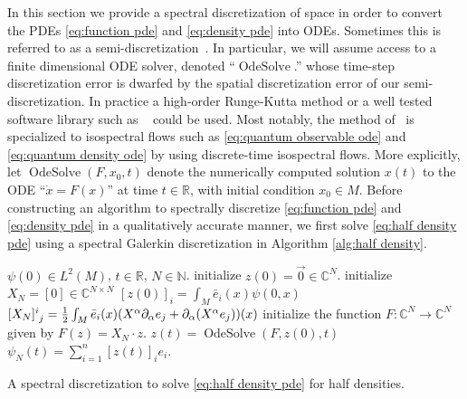 \documentclass[final,leqno]{siamart}
\DeclareMathOperator{\OdeSolve}{OdeSolve}
\begin{document}

In this section we provide a spectral discretization of space in order to convert the PDEs \eqref{eq:function pde} and \eqref{eq:density pde} into ODEs.
Sometimes this is referred to as a semi-discretization~\cite{Gottlieb1977numerical}.
In particular, we will assume access to a finite dimensional ODE solver, denoted ``$\OdeSolve$.'' whose time-step discretization error is dwarfed by the spatial discretization error of our semi-discretization. 
In practice a high-order Runge-Kutta method or a well tested software library such as ~\cite{VODE} could be used.
Most notably, the method of~\cite{Calvo1997} is specialized to isospectral flows such as  \eqref{eq:quantum observable ode} and \eqref{eq:quantum density ode} by using discrete-time isospectral flows.
More explicitly, let $\OdeSolve ( F , x_{0} , t )$ denote the numerically computed solution $x(t)$ to the ODE ``$\dot{x} = F(x)$'' at time $t \in \mathbb{R}$, with initial condition $x_{0} \in M$.
Before constructing an algorithm to spectrally discretize \eqref{eq:function pde} and \eqref{eq:density pde} in a qualitatively accurate manner, we first solve \eqref{eq:half density pde} using a spectral Galerkin discretization in Algorithm \ref{alg:half density}.

\begin{algorithm}
\begin{algorithmic}
	\REQUIRE $\psi(0) \in L^{2}(M)$, $t \in \mathbb{R}$, $N \in \mathbb{N}$.
	\STATE initialize $z(0) = \vec{0} \in \mathbb{C}^{N}$.
	\STATE initialize $X_{N} = [0] \in \mathbb{C}^{N \times N}$
		\STATE $[z(0)]_{i} = \int_{M} \bar{e}_{i}(x) \psi(0,x)$
			\STATE $[X_{N}]\indices{^{i}_{j}} = \frac{1}{2} \int_{M} \bar{e}_{i}(x) ( X^{\alpha} \partial_{\alpha} e_{j} + \partial_{\alpha}( X^{\alpha} e_{j}) )(x)$
		\ENDFOR
	\ENDFOR
	\STATE initialize the function $F: \mathbb{C}^{N} \to \mathbb{C}^{N}$ given by $F(z) = X_{N} \cdot z$.
	\STATE $z(t) = \operatorname{OdeSolve}(  F , z(0) , t)$
	\RETURN  $\psi_{N}(t) = \sum_{i=1}^{n} [z(t)]_{i} e_{i}$.
\end{algorithmic}
\caption{A spectral discretization to solve \eqref{eq:half density pde} for half densities.} \label{alg:half density}
\end{algorithm}
\end{document}
